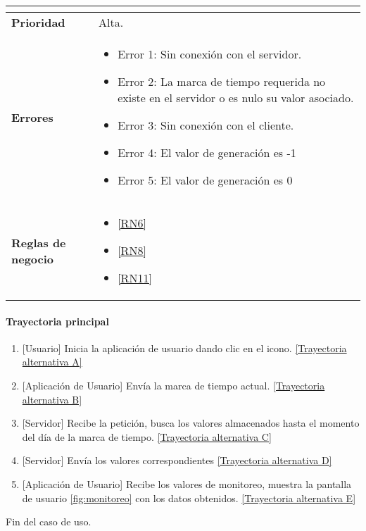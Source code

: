 \begin{longtable}{|J{5cm}|J{10.3cm}|}
\begin{itemize}
		\end{itemize} \\ \hline 
	\textbf{Prioridad} & 
		Alta. \\ \hline
	\textbf{Errores} & 
		\begin{itemize}
		    \item \label{CU5:Error1} Error 1: Sin conexión con el servidor.
			\item \label{CU5:Error2} Error 2: La marca de tiempo requerida no existe en el servidor o es nulo su valor asociado.
		    \item \label{CU5:Error3} Error 3: Sin conexión con el cliente.
		    \item \label{CU5:Error4} Error 4: El valor de generación es -1
		    \item \label{CU5:Error5} Error 5: El valor de generación es 0
		\end{itemize} \\ \hline
	\textbf{Reglas de negocio} & 
		\begin{itemize}
		    \item \ref{RN6}
			\item \ref{RN8}
			\item \ref{RN11}
		\end{itemize} \\ \hline

\end{longtable}

\paragraph{Trayectoria principal}
    \label{SUB-M-CU1.5:TP}
	\begin{enumerate}
	    \item {[Usuario]} Inicia la aplicación de usuario dando clic en el icono. \hyperref[SUB-M-CU5:TA]{[Trayectoria alternativa A]}
	    \item {[Aplicación de Usuario]} Envía la marca de tiempo actual. \hyperref[SUB-M-CU5:TB]{[Trayectoria alternativa B]} 
	    \item {[Servidor]} Recibe la petición, busca los valores almacenados hasta el momento del día de la marca de tiempo. \hyperref[SUB-M-CU5:TC]{[Trayectoria alternativa C]}
	    \item {[Servidor]} Envía los valores correspondientes \hyperref[SUB-M-CU5:TD]{[Trayectoria alternativa D]} 
	    \item {[Aplicación de Usuario]} Recibe los valores de monitoreo, muestra la pantalla de usuario \ref{fig:monitoreo} con los datos obtenidos. \hyperref[SUB-M-CU5:TE]{[Trayectoria alternativa E]}
	\end{enumerate}
	Fin del caso de uso.

